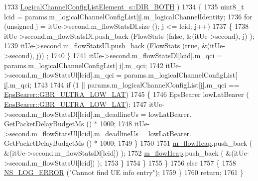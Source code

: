 \begin{DoxyCode}
1733                                 \hyperlink{structns3_1_1LogicalChannelConfigListElement__s_a0ce1e3a6af4d9a3e9fc19361d0af4e00abbf65338c16bef65cdedec87e8a7efaa}{LogicalChannelConfigListElement\_s::DIR\_BOTH}
      )
1734                 \{
1735                         uint8\_t lcid = params.m\_logicalChannelConfigList[\hyperlink{bernuolliDistribution_8m_a6f6ccfcf58b31cb6412107d9d5281426}{i}].m\_logicalChannelIdentity;
1736                         \textcolor{keywordflow}{for} (\textcolor{keywordtype}{unsigned} j = itUe->second.m\_flowStatsDl.size (); j <= lcid; j++)
1737                         \{
1738                                 itUe->second.m\_flowStatsDl.push\_back (FlowStats (\textcolor{keyword}{false}, &(itUe->second), j)
      );
1739                                 itUe->second.m\_flowStatsUl.push\_back (FlowStats (\textcolor{keyword}{true}, &(itUe->second), j))
      ;
1740                         \}
1741                         itUe->second.m\_flowStatsDl[lcid].m\_qci = params.m\_logicalChannelConfigList[
      \hyperlink{bernuolliDistribution_8m_a6f6ccfcf58b31cb6412107d9d5281426}{i}].m\_qci;
1742                         itUe->second.m\_flowStatsUl[lcid].m\_qci = params.m\_logicalChannelConfigList[
      \hyperlink{bernuolliDistribution_8m_a6f6ccfcf58b31cb6412107d9d5281426}{i}].m\_qci;
1743 
1744                         \textcolor{keywordflow}{if} (1 || params.m\_logicalChannelConfigList[\hyperlink{bernuolliDistribution_8m_a6f6ccfcf58b31cb6412107d9d5281426}{i}].m\_qci == 
      \hyperlink{structns3_1_1EpsBearer_aecf0c67109c5eb4ec0b07226fff5885ea1b3267491c7ea82ddc90b433c429c7c1}{EpsBearer::GBR\_ULTRA\_LOW\_LAT})
1745                         \{
1746                                 EpsBearer lowLatBearer (
      \hyperlink{structns3_1_1EpsBearer_aecf0c67109c5eb4ec0b07226fff5885ea1b3267491c7ea82ddc90b433c429c7c1}{EpsBearer::GBR\_ULTRA\_LOW\_LAT});
1747                                 itUe->second.m\_flowStatsDl[lcid].m\_deadlineUs = lowLatBearer.
      GetPacketDelayBudgetMs () * 1000;
1748                                 itUe->second.m\_flowStatsUl[lcid].m\_deadlineUs = lowLatBearer.
      GetPacketDelayBudgetMs () * 1000;
1749                         \}
1750 
1751                         \hyperlink{classns3_1_1MmWaveFlexTtiMaxWeightMacScheduler_a5914fa5ecbe0fef6968a27a04df53e7b}{m\_flowHeap}.push\_back ( &(itUe->second.m\_flowStatsDl[lcid]) );
1752                         \hyperlink{classns3_1_1MmWaveFlexTtiMaxWeightMacScheduler_a5914fa5ecbe0fef6968a27a04df53e7b}{m\_flowHeap}.push\_back ( &(itUe->second.m\_flowStatsUl[lcid]) );
1753                 \}
1754         \}
1755   \}
1756   \textcolor{keywordflow}{else}
1757   \{
1758         \hyperlink{group__logging_ga0261a8db1d4ac5f79417d117634fd455}{NS\_LOG\_ERROR} (\textcolor{stringliteral}{"Cannot find UE info entry"});
1759   \}
1760   \textcolor{keywordflow}{return};
1761 \}
\end{DoxyCode}


